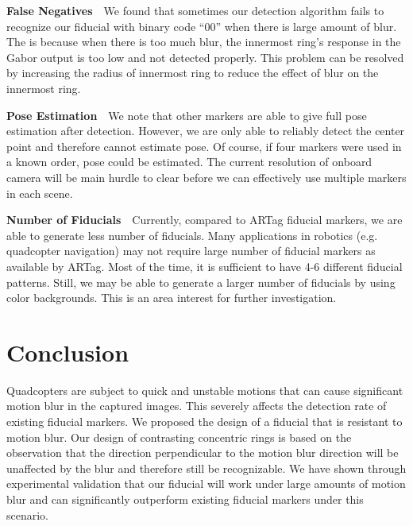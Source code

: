 \documentclass[10pt,twocolumn,letterpaper]{article}
\begin{document}
\noindent\textbf{False Negatives}~~We found that sometimes our detection
algorithm fails to recognize our fiducial with binary code ``00'' when there is
large amount of blur.  The is because when there is too much blur, the innermost
ring's response in the Gabor output is too low and not detected properly.
This problem can be resolved by increasing the radius of innermost ring to
reduce the effect of blur on the innermost ring. 

\noindent\textbf{Pose Estimation}~~We note that other markers are able to give
full pose estimation after detection.  However, we are only able to reliably detect
the center point and therefore cannot estimate pose.  Of course, if four
markers were used in a known order, pose could be estimated. The current
resolution of onboard camera will be main hurdle to clear before we can
effectively use multiple markers in each scene.

\noindent\textbf{Number of Fiducials}~~Currently, compared to ARTag fiducial
markers, we are able to generate less number of fiducials. Many applications in
robotics (e.g. quadcopter navigation) may not require large number of fiducial
markers as available by ARTag.  Most of the time, it is sufficient to have 4-6
different fiducial patterns. Still, we may be able to generate a larger number of
fiducials by using color backgrounds. This is an area interest for further
investigation.

\section{Conclusion}

Quadcopters are subject to quick and unstable motions that can cause significant
motion blur in the captured images. This severely affects the detection rate of
existing fiducial markers. We proposed the design of a fiducial that is
resistant to motion blur. Our design of contrasting concentric rings is based on the
observation that the direction perpendicular to the motion blur direction will
be unaffected by the blur and therefore still be recognizable. We have shown
through experimental validation that our fiducial will work under large
amounts of motion blur and can significantly outperform existing fiducial
markers under this scenario.

{\small


}
\end{document}
